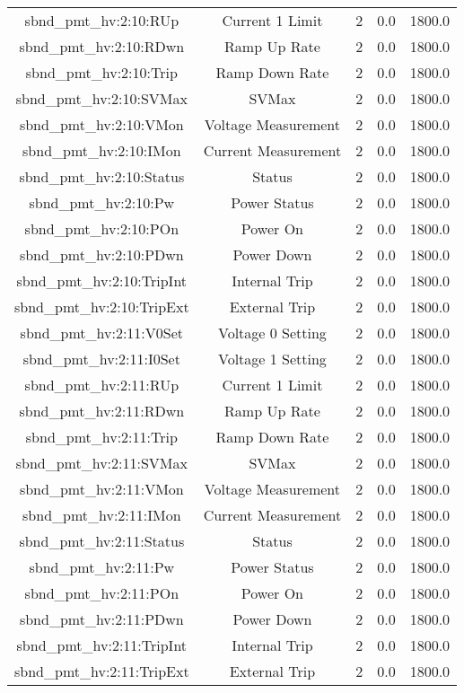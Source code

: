 \begin{center}
\begin{longtable}{c | c c c c }
sbnd\_pmt\_hv:2:10:RUp & Current 1 Limit & 2 & 0.0 & 1800.0\\ 
sbnd\_pmt\_hv:2:10:RDwn & Ramp Up Rate & 2 & 0.0 & 1800.0\\ 
sbnd\_pmt\_hv:2:10:Trip & Ramp Down Rate & 2 & 0.0 & 1800.0\\ 
sbnd\_pmt\_hv:2:10:SVMax & SVMax & 2 & 0.0 & 1800.0\\ 
sbnd\_pmt\_hv:2:10:VMon & Voltage Measurement & 2 & 0.0 & 1800.0\\ 
sbnd\_pmt\_hv:2:10:IMon & Current Measurement & 2 & 0.0 & 1800.0\\ 
sbnd\_pmt\_hv:2:10:Status & Status & 2 & 0.0 & 1800.0\\ 
sbnd\_pmt\_hv:2:10:Pw & Power Status & 2 & 0.0 & 1800.0\\ 
sbnd\_pmt\_hv:2:10:POn & Power On & 2 & 0.0 & 1800.0\\ 
sbnd\_pmt\_hv:2:10:PDwn & Power Down & 2 & 0.0 & 1800.0\\ 
sbnd\_pmt\_hv:2:10:TripInt & Internal Trip & 2 & 0.0 & 1800.0\\ 
sbnd\_pmt\_hv:2:10:TripExt & External Trip & 2 & 0.0 & 1800.0\\ 
sbnd\_pmt\_hv:2:11:V0Set & Voltage 0 Setting & 2 & 0.0 & 1800.0\\ 
sbnd\_pmt\_hv:2:11:I0Set & Voltage 1 Setting & 2 & 0.0 & 1800.0\\ 
sbnd\_pmt\_hv:2:11:RUp & Current 1 Limit & 2 & 0.0 & 1800.0\\ 
sbnd\_pmt\_hv:2:11:RDwn & Ramp Up Rate & 2 & 0.0 & 1800.0\\ 
sbnd\_pmt\_hv:2:11:Trip & Ramp Down Rate & 2 & 0.0 & 1800.0\\ 
sbnd\_pmt\_hv:2:11:SVMax & SVMax & 2 & 0.0 & 1800.0\\ 
sbnd\_pmt\_hv:2:11:VMon & Voltage Measurement & 2 & 0.0 & 1800.0\\ 
sbnd\_pmt\_hv:2:11:IMon & Current Measurement & 2 & 0.0 & 1800.0\\ 
sbnd\_pmt\_hv:2:11:Status & Status & 2 & 0.0 & 1800.0\\ 
sbnd\_pmt\_hv:2:11:Pw & Power Status & 2 & 0.0 & 1800.0\\ 
sbnd\_pmt\_hv:2:11:POn & Power On & 2 & 0.0 & 1800.0\\ 
sbnd\_pmt\_hv:2:11:PDwn & Power Down & 2 & 0.0 & 1800.0\\ 
sbnd\_pmt\_hv:2:11:TripInt & Internal Trip & 2 & 0.0 & 1800.0\\ 
sbnd\_pmt\_hv:2:11:TripExt & External Trip & 2 & 0.0 & 1800.0\\ 

\end{longtable}
\end{center}
